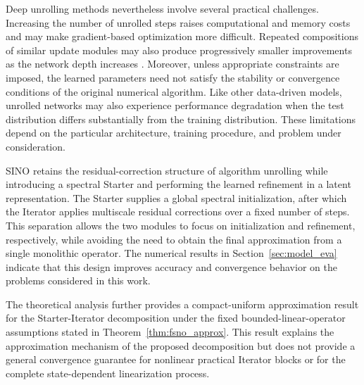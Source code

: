 \documentclass[preprint,numbers,sort&compress]{elsarticle}
\begin{document}
			Deep unrolling methods nevertheless involve several practical challenges. Increasing the number of unrolled steps raises computational and memory costs and may make gradient-based optimization more difficult. Repeated compositions of similar update modules may also produce progressively
			smaller improvements as the network depth increases
			\cite{xu2025overview}. Moreover, unless appropriate constraints are imposed, the learned parameters need not satisfy the stability or convergence conditions of the original numerical algorithm. Like other data-driven models, unrolled networks may also experience performance degradation when the test distribution differs substantially from the training
			distribution. These limitations depend on the particular architecture, training procedure, and problem under consideration.
			
			SINO retains the residual-correction structure of algorithm unrolling while introducing a spectral Starter and performing the learned refinement in a latent representation. The Starter supplies a global spectral initialization, after which the Iterator applies multiscale residual corrections over a fixed number of steps. This separation allows the two
			modules to focus on initialization and refinement, respectively, while avoiding the need to obtain the final approximation from a single monolithic operator. The numerical results in
			Section~\ref{sec:model_eva} indicate that this design improves accuracy and convergence behavior on the problems considered in this work.
			
			The theoretical analysis further provides a compact-uniform approximation result for the Starter-Iterator decomposition under the fixed bounded-linear-operator assumptions stated in
			Theorem~\ref{thm:fsno_approx}. This result explains the approximation mechanism of the proposed decomposition but does not provide a general convergence guarantee for nonlinear practical Iterator blocks or for the complete state-dependent linearization process.
			
\end{document}
